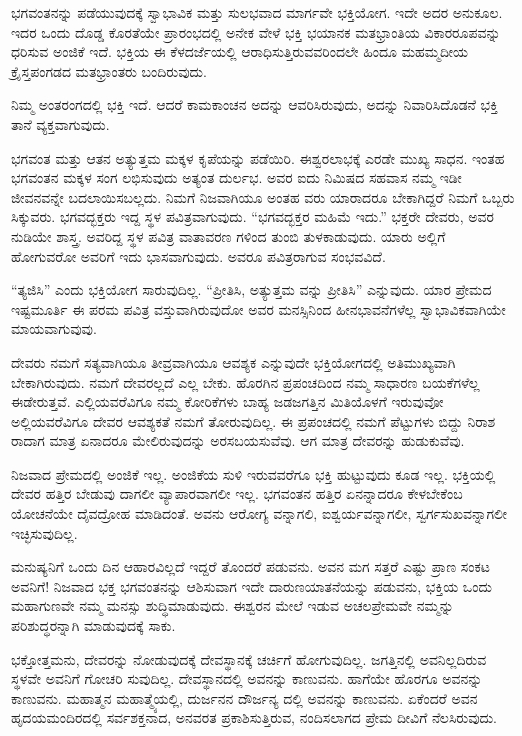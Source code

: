 ಭಗವಂತನನ್ನು ಪಡೆಯುವುದಕ್ಕೆ ಸ್ವಾಭಾವಿಕ ಮತ್ತು ಸುಲಭವಾದ ಮಾರ್ಗವೇ ಭಕ್ತಿಯೋಗ. ಇದೇ ಅದರ ಅನುಕೂಲ. ಇದರ ಒಂದು ದೊಡ್ಡ ಕೊರತೆಯೇ ಪ್ರಾರಂಭದಲ್ಲಿ ಅನೇಕ ವೇಳೆ ಭಕ್ತಿ ಭಯಾನಕ ಮತಭ್ರಾಂತಿಯ ವಿಕಾರರೂಪವನ್ನು ಧರಿಸುವ ಅಂಜಿಕೆ ಇದೆ. ಭಕ್ತಿಯ ಈ ಕೆಳದರ್ಜೆಯಲ್ಲಿ ಆರಾಧಿಸುತ್ತಿರುವವರಿಂದಲೇ ಹಿಂದೂ ಮಹಮ್ಮದೀಯ ಕ್ರೈಸ್ತಪಂಗಡದ ಮತಭ್ರಾಂತರು ಬಂದಿರುವುದು.

ನಿಮ್ಮ ಅಂತರಂಗದಲ್ಲಿ ಭಕ್ತಿ ಇದೆ. ಆದರೆ ಕಾಮಕಾಂಚನ ಅದನ್ನು ಆವರಿಸಿರುವುದು, ಅದನ್ನು ನಿವಾರಿಸಿದೊಡನೆ ಭಕ್ತಿ ತಾನೆ ವ್ಯಕ್ತವಾಗುವುದು.

ಭಗವಂತ ಮತ್ತು ಆತನ ಅತ್ಯುತ್ತಮ ಮಕ್ಕಳ ಕೃಪೆಯನ್ನು ಪಡೆಯಿರಿ. ಈಶ್ವರಲಾಭಕ್ಕೆ ಎರಡೇ ಮುಖ್ಯ ಸಾಧನ. ಇಂತಹ ಭಗವಂತನ ಮಕ್ಕಳ ಸಂಗ ಲಭಿಸುವುದು ಅತ್ಯಂತ ದುರ್ಲಭ. ಅವರ ಐದು ನಿಮಿಷದ ಸಹವಾಸ ನಮ್ಮ ಇಡೀ ಜೀವನವನ್ನೇ ಬದಲಾಯಿಸಬಲ್ಲದು. ನಿಮಗೆ ನಿಜವಾಗಿಯೂ ಅಂತಹ ವರು ಯಾರಾದರೂ ಬೇಕಾಗಿದ್ದರೆ ನಿಮಗೆ ಒಬ್ಬರು ಸಿಕ್ಕುವರು. ಭಗವದ್ಭಕ್ತರು ಇದ್ದ ಸ್ಥಳ ಪವಿತ್ರವಾಗುವುದು. “ಭಗವದ್ಭಕ್ತರ ಮಹಿಮೆ ಇದು.” ಭಕ್ತರೇ ದೇವರು, ಅವರ ನುಡಿಯೇ ಶಾಸ್ತ್ರ. ಅವರಿದ್ದ ಸ್ಥಳ ಪವಿತ್ರ ವಾತಾವರಣ ಗಳಿಂದ ತುಂಬಿ ತುಳಕಾಡುವುದು. ಯಾರು ಅಲ್ಲಿಗೆ ಹೋಗುವರೋ ಅವರಿಗೆ ಇದು ಭಾಸವಾಗುವುದು. ಅವರೂ ಪವಿತ್ರರಾಗುವ ಸಂಭವವಿದೆ.

“ತ್ಯಜಿಸಿ” ಎಂದು ಭಕ್ತಿಯೋಗ ಸಾರುವುದಿಲ್ಲ. “ಪ್ರೀತಿಸಿ, ಅತ್ಯುತ್ತಮ ವನ್ನು ಪ್ರೀತಿಸಿ” ಎನ್ನುವುದು. ಯಾರ ಪ್ರೇಮದ ಇಷ್ಟಮೂರ್ತಿ ಈ ಪರಮ ಪವಿತ್ರ ವಸ್ತುವಾಗಿರುವುದೋ ಅವರ ಮನಸ್ಸಿನಿಂದ ಹೀನಭಾವನೆಗಳೆಲ್ಲ ಸ್ವಾಭಾವಿಕವಾಗಿಯೇ ಮಾಯವಾಗುವುವು.

ದೇವರು ನಮಗೆ ಸತ್ಯವಾಗಿಯೂ ತೀವ್ರವಾಗಿಯೂ ಆವಶ್ಯಕ ಎನ್ನುವುದೇ ಭಕ್ತಿಯೋಗದಲ್ಲಿ ಅತಿಮುಖ್ಯವಾಗಿ ಬೇಕಾಗಿರುವುದು. ನಮಗೆ ದೇವರಲ್ಲದೆ ಎಲ್ಲ ಬೇಕು. ಹೊರಗಿನ ಪ್ರಪಂಚದಿಂದ ನಮ್ಮ ಸಾಧಾರಣ ಬಯಕೆಗಳೆಲ್ಲ ಈಡೇರುತ್ತವೆ. ಎಲ್ಲಿಯವರೆವಿಗೂ ನಮ್ಮ ಕೋರಿಕೆಗಳು ಬಾಹ್ಯ ಜಡಜಗತ್ತಿನ ಮಿತಿಯೊಳಗೆ ಇರುವುವೋ ಅಲ್ಲಿಯವರೆವಿಗೂ ದೇವರ ಆವಶ್ಯಕತೆ ನಮಗೆ ತೋರುವುದಿಲ್ಲ. ಈ ಪ್ರಪಂಚದಲ್ಲಿ ನಮಗೆ ಪೆಟ್ಟುಗಳು ಬಿದ್ದು ನಿರಾಶ ರಾದಾಗ ಮಾತ್ರ ಏನಾದರೂ ಮೇಲಿರುವುದನ್ನು ಅರಸಬಯಸುವೆವು. ಆಗ ಮಾತ್ರ ದೇವರನ್ನು ಹುಡುಕುವೆವು.

ನಿಜವಾದ ಪ್ರೇಮದಲ್ಲಿ ಅಂಜಿಕೆ ಇಲ್ಲ. ಅಂಜಿಕೆಯ ಸುಳಿ ಇರುವವರೆಗೂ ಭಕ್ತಿ ಹುಟ್ಟುವುದು ಕೂಡ ಇಲ್ಲ. ಭಕ್ತಿಯಲ್ಲಿ ದೇವರ ಹತ್ತಿರ ಬೇಡುವು ದಾಗಲೀ ವ್ಯಾಪಾರವಾಗಲೀ ಇಲ್ಲ. ಭಗವಂತನ ಹತ್ತಿರ ಏನನ್ನಾದರೂ ಕೇಳಬೇಕೆಂಬ ಯೋಚನೆಯೇ ದೈವದ್ರೋಹ ಮಾಡಿದಂತೆ. ಅವನು ಆರೋಗ್ಯ ವನ್ನಾಗಲಿ, ಐಶ್ವರ್ಯವನ್ನಾಗಲೀ, ಸ್ವರ್ಗಸುಖವನ್ನಾಗಲೀ ಇಚ್ಛಿಸುವುದಿಲ್ಲ.

ಮನುಷ್ಯನಿಗೆ ಒಂದು ದಿನ ಆಹಾರವಿಲ್ಲದೆ ಇದ್ದರೆ ತೊಂದರೆ ಪಡುವನು. ಅವನ ಮಗ ಸತ್ತರೆ ಎಷ್ಟು ಪ್ರಾಣ ಸಂಕಟ ಅವನಿಗೆ! ನಿಜವಾದ ಭಕ್ತ ಭಗವಂತನನ್ನು ಆಶಿಸುವಾಗ ಇದೇ ದಾರುಣಯಾತನೆಯನ್ನು ಪಡುವನು, ಭಕ್ತಿಯ ಒಂದು ಮಹಾಗುಣವೇ ನಮ್ಮ ಮನಸ್ಸು ಶುದ್ಧಿಮಾಡುವುದು. ಈಶ್ವರನ ಮೇಲೆ ಇಡುವ ಅಚಲಪ್ರೇಮವೇ ನಮ್ಮನ್ನು ಪರಿಶುದ್ಧರನ್ನಾಗಿ ಮಾಡುವುದಕ್ಕೆ ಸಾಕು.

ಭಕ್ತೋತ್ತಮನು, ದೇವರನ್ನು ನೋಡುವುದಕ್ಕೆ ದೇವಸ್ಥಾನಕ್ಕೆ ಚರ್ಚಿಗೆ ಹೋಗುವುದಿಲ್ಲ. ಜಗತ್ತಿನಲ್ಲಿ ಅವನಿಲ್ಲದಿರುವ ಸ್ಥಳವೇ ಅವನಿಗೆ ಗೋಚರಿ ಸುವುದಿಲ್ಲ. ದೇವಸ್ಥಾನದಲ್ಲಿ ಅವನನ್ನು ಕಾಣುವನು. ಹಾಗೆಯೇ ಹೊರಗೂ ಅವನನ್ನು ಕಾಣುವನು. ಮಹಾತ್ಮನ ಮಹಾತ್ಮ್ಯೆಯಲ್ಲಿ, ದುರ್ಜನನ ದೌರ್ಜನ್ಯ ದಲ್ಲಿ ಅವನನ್ನು ಕಾಣುವನು. ಏಕೆಂದರೆ ಅವನ ಹೃದಯಮಂದಿರದಲ್ಲಿ ಸರ್ವಶಕ್ತನಾದ, ಅನವರತ ಪ್ರಕಾಶಿಸುತ್ತಿರುವ, ನಂದಿಸಲಾಗದ ಪ್ರೇಮ ದೀವಿಗೆ ನೆಲಸಿರುವುದು.

